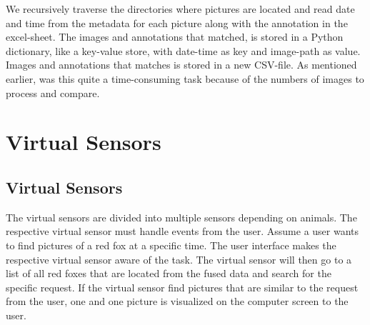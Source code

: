 \documentclass[USenglish]{uit-thesis}
\begin{document}
We recursively traverse the directories where pictures are located and read date and time from the metadata for each picture along with the annotation in the excel-sheet. The images and annotations that matched, is stored in a Python dictionary, like a key-value store, with date-time as key and image-path as value. Images and annotations that matches is stored in a new CSV-file.
As mentioned earlier, was this quite a time-consuming task because of the numbers of images to process and compare.


\section{Virtual Sensors}



\subsection{Virtual Sensors} \label{ssec:des_vs}
The virtual sensors are divided into multiple sensors depending on animals. The respective virtual sensor must handle events from the user. Assume a user wants to find pictures of a red fox at a specific time.  The user interface makes the respective virtual sensor aware of the task. The virtual sensor will then go to a list of all red foxes that are located from the fused data and search for the specific request. If the virtual sensor find pictures that are similar to the request from the user, one and one picture is visualized on the computer screen to the user.

\end{document}
